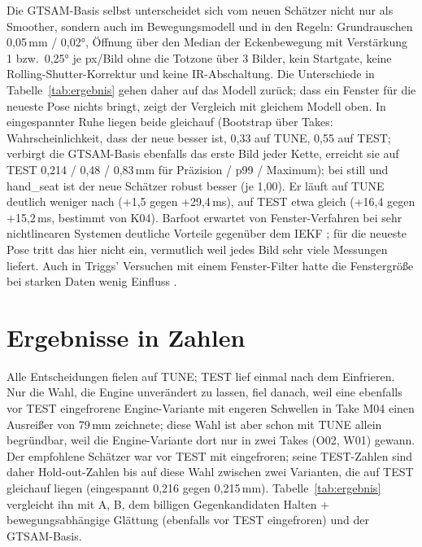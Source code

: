 \documentclass[11pt,a4paper,fleqn]{article}
\begin{document}
Die GTSAM-Basis selbst unterscheidet sich vom neuen Schätzer nicht nur als Smoother, sondern auch im
Bewegungsmodell und in den Regeln: Grundrauschen 0,05\,mm / 0,02°, Öffnung über den Median der Eckenbewegung mit
Verstärkung 1 bzw.\ 0,25° je px/Bild ohne die Totzone über 3 Bilder, kein Startgate, keine
Rolling-Shutter-Korrektur und keine IR-Abschaltung. Die Unterschiede in
Tabelle~\ref{tab:ergebnis} gehen daher auf das Modell zurück; dass ein Fenster für die neueste Pose nichts bringt,
zeigt der Vergleich mit gleichem Modell oben. In eingespannter Ruhe liegen beide gleichauf (Bootstrap über Takes:
Wahrscheinlichkeit, dass der neue besser ist, 0,33 auf TUNE, 0,55 auf TEST; verbirgt die GTSAM-Basis ebenfalls das
erste Bild jeder Kette, erreicht sie auf TEST 0,214 / 0,48 / 0,83\,mm für Präzision / p99 / Maximum); bei still und hand\_seat ist der neue
Schätzer robust besser (je 1,00). Er läuft auf TUNE deutlich weniger nach (+1,5 gegen +29,4\,ms), auf TEST etwa
gleich (+16,4 gegen +15,2\,ms, bestimmt von K04). Barfoot erwartet von Fenster-Verfahren bei sehr nichtlinearen
Systemen deutliche Vorteile gegenüber dem IEKF \cite[§4.3.4]{barfoot2017state}; für die neueste Pose tritt das
hier nicht ein, vermutlich weil jedes Bild sehr viele Messungen liefert. Auch in Triggs' Versuchen mit einem
Fenster-Filter hatte die Fenstergröße bei starken Daten wenig Einfluss \cite[Abb.~7]{triggs2000bundle}.

\section{Ergebnisse in Zahlen}
\label{sec:ergebnis}

Alle Entscheidungen fielen auf TUNE; TEST lief einmal nach dem Einfrieren. Nur die Wahl, die Engine unverändert
zu lassen, fiel danach, weil eine ebenfalls vor TEST eingefrorene Engine-Variante mit engeren Schwellen in Take M04
einen Ausreißer von 79\,mm zeichnete; diese Wahl ist aber schon mit TUNE allein begründbar, weil die
Engine-Variante dort nur in zwei Takes (O02, W01) gewann. Der empfohlene Schätzer war vor TEST mit eingefroren;
seine TEST-Zahlen sind daher Hold-out-Zahlen bis auf diese Wahl zwischen zwei Varianten, die auf TEST gleichauf
liegen (eingespannt 0,216 gegen 0,215\,mm). Tabelle~\ref{tab:ergebnis} vergleicht ihn mit A, B, dem billigen
Gegenkandidaten \glqq Halten + bewegungsabhängige Glättung\grqq{} (ebenfalls vor TEST eingefroren) und der
GTSAM-Basis.
\end{document}
